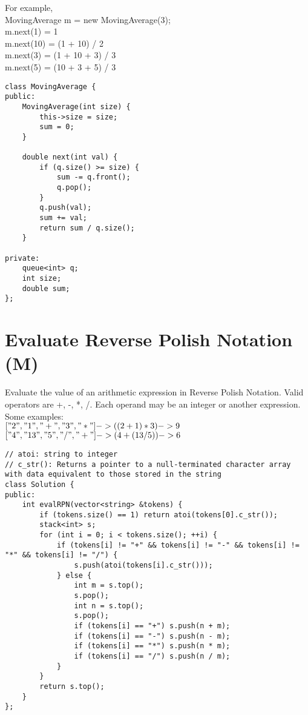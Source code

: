 For example,\\
MovingAverage m = new MovingAverage(3);\\
m.next(1) = 1\\
m.next(10) = (1 + 10) / 2\\
m.next(3) = (1 + 10 + 3) / 3\\
m.next(5) = (10 + 3 + 5) / 3 \\

\begin{lstlisting}
class MovingAverage {
public:
    MovingAverage(int size) {
        this->size = size;
        sum = 0;
    }
    
    double next(int val) {
        if (q.size() >= size) {	
            sum -= q.front();
            q.pop();
        }
        q.push(val);
        sum += val;
        return sum / q.size();
    }
    
private:
    queue<int> q;
    int size;
    double sum;
};
\end{lstlisting}


\section{Evaluate Reverse Polish Notation (M)}
Evaluate the value of an arithmetic expression in Reverse Polish Notation. Valid operators are +, -, *, /. Each operand may be an integer or another expression.\\

Some examples:\\
  $["2", "1", "+", "3", "*"] -> ((2 + 1) * 3) -> 9$ \\
  $["4", "13", "5", "/", "+"] -> (4 + (13 / 5)) -> 6$ \\

\begin{lstlisting}
// atoi: string to integer
// c_str(): Returns a pointer to a null-terminated character array with data equivalent to those stored in the string
class Solution {
public:
    int evalRPN(vector<string> &tokens) {
        if (tokens.size() == 1) return atoi(tokens[0].c_str());
        stack<int> s;
        for (int i = 0; i < tokens.size(); ++i) {
            if (tokens[i] != "+" && tokens[i] != "-" && tokens[i] != "*" && tokens[i] != "/") {
                s.push(atoi(tokens[i].c_str()));
            } else {
                int m = s.top();
                s.pop();
                int n = s.top();
                s.pop();
                if (tokens[i] == "+") s.push(n + m);
                if (tokens[i] == "-") s.push(n - m);
                if (tokens[i] == "*") s.push(n * m);
                if (tokens[i] == "/") s.push(n / m);
            }
        }
        return s.top();
    }
};
\end{lstlisting}




